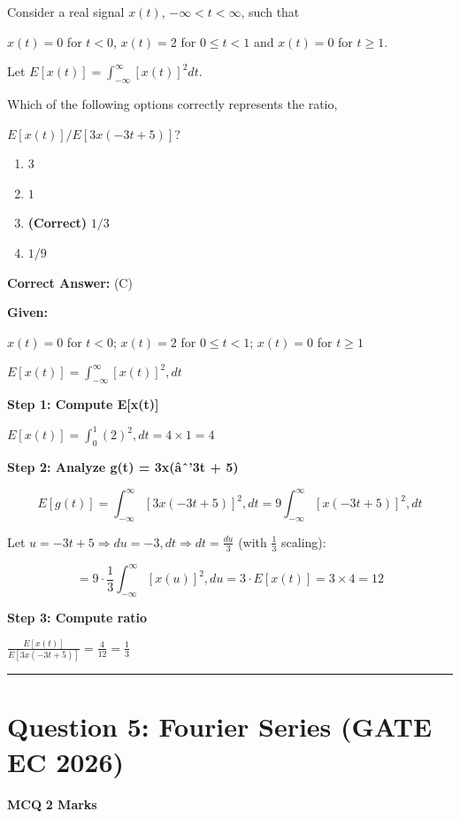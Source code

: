 \documentclass[11pt,a4paper]{article}
\begin{document}
\noindent Consider a real signal $x(t)$, $-\infty < t < \infty$, such that 

$x(t) = 0$ for $t < 0$, $x(t) = 2$ for $0 \le t < 1$ and $x(t) = 0$ for $t \ge 1$. 

Let $E[x(t)] = \int_{-\infty}^{\infty} [x(t)]^2 dt$. 

Which of the following options correctly represents the ratio, 

$E[x(t)] / E[3x(-3t + 5)]$?


\begin{enumerate}[label=(\Alph*)]
    \item $3$
    \item $1$
    \item \textbf{(Correct)} $1/3$
    \item $1/9$
\end{enumerate}

\noindent \textbf{Correct Answer:} (C)

\begin{tcolorbox}[solbox, title=Detailed Solution -- Question 4]
\textbf{Given:}

$x(t) = 0$ for $t < 0$; $x(t) = 2$ for $0 \le t < 1$; $x(t) = 0$ for $t \ge 1$

$E[x(t)] = \int_{-\infty}^{\infty}[x(t)]^2,dt$

\textbf{Step 1: Compute E[x(t)]}

$E[x(t)] = \int_0^1 (2)^2,dt = 4 \times 1 = 4$

\textbf{Step 2: Analyze g(t) = 3x(âˆ’3t + 5)}

\[
E[g(t)] = \int_{-\infty}^{\infty}[3x(-3t+5)]^2,dt = 9\int_{-\infty}^{\infty}[x(-3t+5)]^2,dt
\]

Let $u = -3t + 5 \Rightarrow du = -3,dt \Rightarrow dt = \frac{du}{3}$ (with $\frac{1}{3}$ scaling):

\[
= 9 \cdot \frac{1}{3}\int_{-\infty}^{\infty}[x(u)]^2,du = 3 \cdot E[x(t)] = 3 \times 4 = 12
\]

\textbf{Step 3: Compute ratio}

$\frac{E[x(t)]}{E[3x(-3t+5)]} = \frac{4}{12} = \frac{1}{3}$
\end{tcolorbox}

\vspace{1.5em}
\hrule
\vspace{1.5em}

\section*{Question 5: Fourier Series (GATE EC 2026)}
\noindent \textbf{\color{primary}MCQ} \hfill \textbf{\color{secondary}2 Marks}
\end{document}
